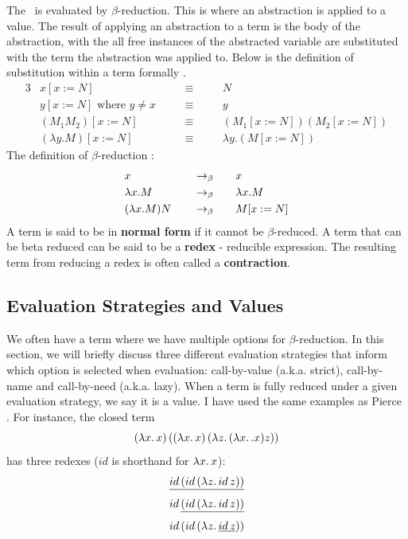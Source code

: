 \noindent The \lcalc\ is evaluated by $\beta$-reduction. This is where an abstraction is applied to a value. The result of applying an abstraction to a term is the body of the abstraction, with the all free instances of the abstracted variable are substituted with the term the abstraction was applied to. Below is the definition of substitution within a term formally \cite{barendregt2013lambda}. 
\noindent\begin{alignat*}{3}
&x[x:=N]                        \quad && \equiv \quad && N                       \\
&y[x:=N] \text{ where } y \ne x \quad && \equiv \quad && y                       \\
&(M_1 M_2)[x:=N]                \quad && \equiv \quad && (M_1[x:=N]) (M_2[x:=N]) \\
&(\lambda y.M)[x:=N]            \quad && \equiv \quad && \lambda y.(M[x:=N])     
\end{alignat*}  
\noindent The definition of $\beta$-reduction \cite{barendregt2013lambda}:
\begin{alignat*}{3}
&x                 \quad && \rightarrow_\beta \quad &&        x           \\
&\lambda x.M       \quad && \rightarrow_\beta \quad &&        \lambda x.M \\
&(\lambda x.M) N   \quad && \rightarrow_\beta \quad &&        M[x:=N]
\end{alignat*}
A term is said to be in \textbf{normal form} if it cannot be $\beta$-reduced. A term that can be beta reduced can be said to be a \textbf{redex} - reducible expression. The resulting term from reducing a redex is often called a \textbf{contraction}.

\subsection{Evaluation Strategies and Values}
We often have a term where we have multiple options for $\beta$-reduction. In this section, we will briefly discuss three different evaluation strategies that inform which option is selected when evaluation: call-by-value (a.k.a. strict), call-by-name and call-by-need (a.k.a. lazy). When a term is fully reduced under a given evaluation strategy, we say it is a value. I have used the same examples as Pierce \cite{pierce2002types}. For instance, the closed term 
\[(\lambda x.\, x)\,((\lambda x.\, x)\,(\lambda z.\, (\lambda x.\,. x) z))\] has three redexes ($id$ is shorthand for $\lambda x.\, x$):
\[\underline{id\,(id\,(\lambda z.\, id\,z))}\]
\[id\,\underline{(id\,(\lambda z.\, id\,z))}\]
\[id\,(id\,(\lambda z.\, \underline{id\,z}))\]

